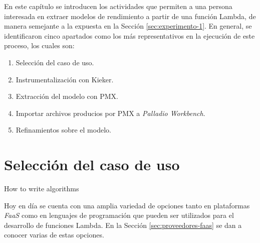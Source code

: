 En este capítulo se introducen los actividades que permiten a una persona interesada en extraer modelos de rendimiento a partir de una función Lambda, de manera semejante a la expuesta en la Sección \ref{sec:experimento-1}. En general, se identificaron cinco apartados como los más representativos en la ejecución de este proceso, los cuales son:
\begin{enumerate}
    \item Selección del caso de uso.
    \item Instrumentalización con Kieker.
    \item Extracción del modelo con PMX.
    \item Importar archivos producios por PMX a \emph{Palladio Workbench}.
    \item Refinamientos sobre el modelo.
\end{enumerate}

\section{Selección del caso de uso}

\begin{singlespace}
\begin{algorithm}[H]
\SetAlgoLined

\caption{How to write algorithms}
\end{algorithm}
\end{singlespace}

Hoy en día se cuenta con una amplia variedad de opciones tanto en plataformas \emph{FaaS} como en lenguajes de programación que pueden ser utilizados para el desarrollo de funciones Lambda. En la Sección \ref{sec:proveedores-faas} se dan a conocer varias de estas opciones.

